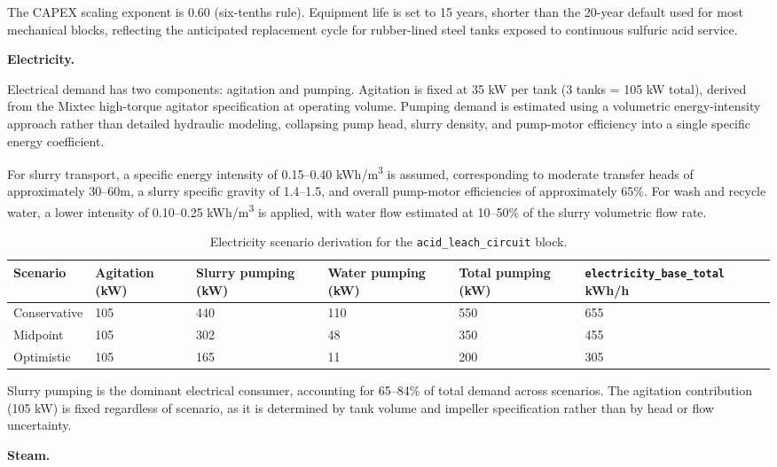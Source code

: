 \noindent The CAPEX scaling exponent is 0.60 (six-tenths rule). Equipment life is set to 15 years, shorter than the 20-year default used for most mechanical blocks, reflecting the anticipated replacement cycle for rubber-lined steel tanks exposed to continuous sulfuric acid service.

\medskip
\noindent\textbf{Electricity.}\quad

Electrical demand has two components: agitation and pumping. Agitation is fixed at 35 kW per tank (3 tanks = 105 kW total), derived from the Mixtec high-torque agitator specification at operating volume. Pumping demand is estimated using a volumetric energy-intensity approach rather than detailed hydraulic modeling, collapsing pump head, slurry density, and pump-motor efficiency into a single specific energy coefficient.

For slurry transport, a specific energy intensity of 0.15--0.40 \si{kWh/m^3} is assumed, corresponding to moderate transfer heads of approximately 30--60m, a slurry specific gravity of 1.4--1.5, and overall pump-motor efficiencies of approximately 65\%. For wash and recycle water, a lower intensity of 0.10--0.25 \si{kWh/m^3} is applied, with water flow estimated at 10--50\% of the slurry volumetric flow rate.

\begin{table}[h!]
\caption{Electricity scenario derivation for the \texttt{acid\_leach\_circuit} block.}
\centering
\begin{tabular}{lp{2cm}p{2cm}p{2cm}p{2cm}p{3cm}}
\toprule
\textbf{Scenario} & \textbf{Agitation (kW)} & \textbf{Slurry pumping (kW)} & \textbf{Water pumping (kW)} & \textbf{Total pumping (kW)} & \texttt{electricity\_base\_total} \textbf{kWh/h} \\
\midrule
Conservative & 105 & 440 & 110 & 550 & 655 \\
Midpoint     & 105 & 302 &  48 & 350 & 455 \\
Optimistic   & 105 & 165 &  11 & 200 & 305 \\
\bottomrule
\end{tabular}
\end{table}

\noindent Slurry pumping is the dominant electrical consumer, accounting for 65--84\% of total demand across scenarios. The agitation contribution (105 kW) is fixed regardless of scenario, as it is determined by tank volume and impeller specification rather than by head or flow uncertainty.

\medskip
\noindent\textbf{Steam.}\quad

